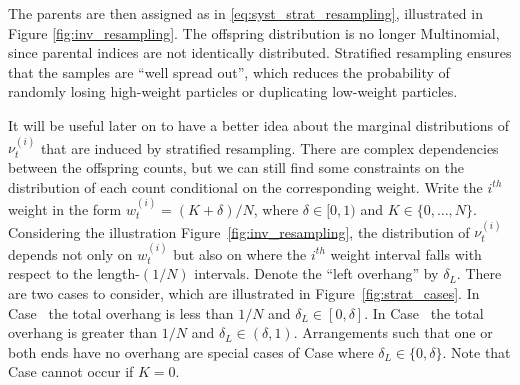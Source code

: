 The parents are then assigned as in \eqref{eq:syst_strat_resampling}, illustrated in Figure \ref{fig:inv_resampling}.
The offspring distribution is no longer Multinomial, since parental indices are not identically distributed.
Stratified resampling ensures that the samples are ``well spread out'', which reduces the probability of randomly losing high-weight particles or duplicating low-weight particles.

It will be useful later on to have a better idea about the marginal distributions of $\nu_t^{(i)}$ that are induced by stratified resampling. There are complex dependencies between the offspring counts, but we can still find some constraints on the distribution of each count conditional on the corresponding weight.
Write the $i^{th}$ weight in the form $w_t^{(i)} = (K + \delta)/N$, where $\delta \in [0,1)$ and $K\in \{0,\dots,N\}$.
Considering the illustration Figure~\ref{fig:inv_resampling}, the distribution of $\nu_t^{(i)}$ depends not only on $w_t^{(i)}$ but also on where the $i^{th}$ weight interval falls with respect to the length-$(1/N)$ intervals. 
Denote the ``left overhang'' by $\delta_L$.
There are two cases to consider, which are illustrated in Figure~\ref{fig:strat_cases}.
In Case~ the total overhang is less than $1/N$ and $\delta_L \in [0,\delta]$.
In Case~ the total overhang is greater than $1/N$ and $\delta_L \in (\delta, 1)$.
Arrangements such that one or both ends have no overhang are special cases of Case  where $\delta_L \in \{0,\delta\}$.
Note that Case  cannot occur if $K=0$.


